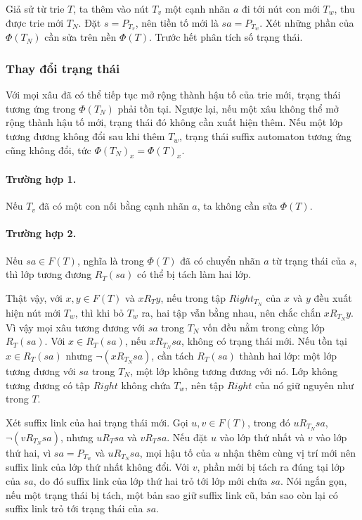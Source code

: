 \documentclass[11pt]{article}
\begin{document}
Giả sử từ trie \(T\), ta thêm vào nút \(T_v\) một cạnh nhãn \(a\) đi tới nút con
mới \(T_w\), thu được trie mới \(T_N\). Đặt \(s=P_{T_v}\), nên tiền tố mới là
\(sa=P_{T_w}\). Xét những phần của \(\Phi(T_N)\) cần sửa trên nền \(\Phi(T)\).
Trước hết phân tích số trạng thái.

\subsubsection{Thay đổi trạng thái}

Với mọi xâu đã có thể tiếp tục mở rộng thành hậu tố của trie mới, trạng thái
tương ứng trong \(\Phi(T_N)\) phải tồn tại. Ngược lại, nếu một xâu không thể mở
rộng thành hậu tố mới, trạng thái đó không cần xuất hiện thêm. Nếu một lớp tương
đương không đổi sau khi thêm \(T_w\), trạng thái suffix automaton tương ứng cũng
không đổi, tức \(\Phi(T_N)_x=\Phi(T)_x\).

\paragraph{Trường hợp 1.}
Nếu \(T_v\) đã có một con nối bằng cạnh nhãn \(a\), ta không cần sửa
\(\Phi(T)\).

\paragraph{Trường hợp 2.}
Nếu \(sa\in F(T)\), nghĩa là trong \(\Phi(T)\) đã có chuyển nhãn \(a\) từ trạng
thái của \(s\), thì lớp tương đương \(R_T(sa)\) có thể bị tách làm hai lớp.

Thật vậy, với \(x,y\in F(T)\) và \(xR_Ty\), nếu trong tập \(Right_{T_N}\) của
\(x\) và \(y\) đều xuất hiện nút mới \(T_w\), thì khi bỏ \(T_w\) ra, hai tập
vẫn bằng nhau, nên chắc chắn \(xR_{T_N}y\). Vì vậy mọi xâu tương đương với
\(sa\) trong \(T_N\) vốn đều nằm trong cùng lớp \(R_T(sa)\). Với
\(x\in R_T(sa)\), nếu \(xR_{T_N}sa\), không có trạng thái mới. Nếu tồn tại
\(x\in R_T(sa)\) nhưng \(\neg(xR_{T_N}sa)\), cần tách \(R_T(sa)\) thành hai lớp:
một lớp tương đương với \(sa\) trong \(T_N\), một lớp không tương đương với nó.
Lớp không tương đương có tập \(Right\) không chứa \(T_w\), nên tập \(Right\) của
nó giữ nguyên như trong \(T\).

Xét suffix link của hai trạng thái mới. Gọi \(u,v\in F(T)\), trong đó
\(uR_{T_N}sa\), \(\neg(vR_{T_N}sa)\), nhưng \(uR_Tsa\) và \(vR_Tsa\). Nếu đặt
\(u\) vào lớp thứ nhất và \(v\) vào lớp thứ hai, vì \(sa=P_{T_w}\) và
\(uR_{T_N}sa\), mọi hậu tố của \(u\) nhận thêm cùng vị trí mới nên suffix link
của lớp thứ nhất không đổi. Với \(v\), phần mới bị tách ra đúng tại lớp của
\(sa\), do đó suffix link của lớp thứ hai trỏ tới lớp mới chứa \(sa\). Nói ngắn
gọn, nếu một trạng thái bị tách, một bản sao giữ suffix link cũ, bản sao còn
lại có suffix link trỏ tới trạng thái của \(sa\).
\end{document}
